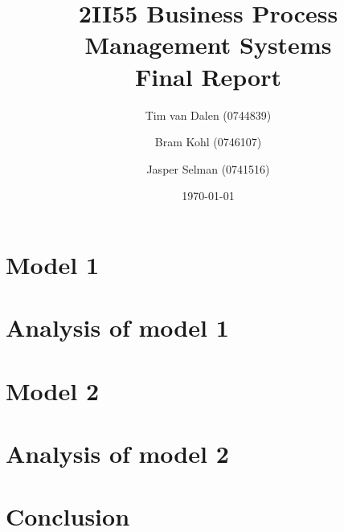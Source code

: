 \documentclass[11pt,a4paper,twocolumn]{article}
\title{
	{\huge 2II55 Business Process Management Systems}\\
	{\large Final Report}
}
\author{
	Tim van Dalen (0744839)
	\and
	Bram Kohl (0746107)
	\and
	Jasper Selman (0741516)
}
\date{\today}
\begin{document}
	\maketitle

	

	\section{Model 1}
	\label{sec:model1}
	

	\section{Analysis of model 1}
	\label{sec:analysis1}
	

	\section{Model 2}
	\label{sec:model2}
	

	\section{Analysis of model 2}
	\label{sec:analysis2}
	

	\section{Conclusion}
	\label{sec:conclusion}
	

	\begin{appendix}
	
	\end{appendix}
\end{document}
